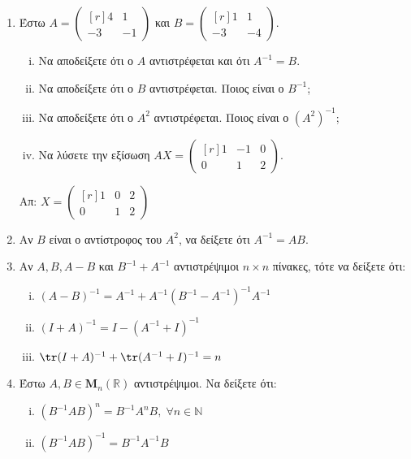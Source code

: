 \begin{enumerate}
  
  \item Έστω $ A = 
    \begin{pmatrix*}[r]
      4 & 1 \\
      -3 & -1
    \end{pmatrix*} $ και $ B = 
    \begin{pmatrix*}[r]
      1 & 1 \\
      -3 & -4
    \end{pmatrix*}$. 
    \begin{enumerate}[i)]
      \item Να αποδείξετε ότι ο $A$ αντιστρέφεται και ότι $ A^{-1} = B $.
      \item Να αποδείξετε ότι ο $ B $ αντιστρέφεται. Ποιος είναι ο $ B^{-1} $;
      \item Να αποδείξετε ότι ο $ A^{2} $ αντιστρέφεται. Ποιος είναι ο $ (A^{2})^{-1} $;
      \item Να λύσετε την εξίσωση $ AX= 
        \begin{pmatrix*}[r]
          1 & -1 & 0 \\
          0 & 1 & 2
        \end{pmatrix*} $.
    \end{enumerate}

    \hfill Απ: $ X= 
    \begin{pmatrix*}[r]
      1 & 0 & 2 \\
      0 & 1 & 2
    \end{pmatrix*} $ 

  \item Αν $B$ είναι ο αντίστροφος του $ A^{2} $, να δείξετε ότι $ A^{-1}=AB $.

  \item Αν $ A,B,A-B $ και $ B^{-1}+A^{-1} $ αντιστρέψιμοι 
    $ n \times n $ πίνακες, τότε να δείξετε ότι:
    \begin{enumerate}[i)]
      \item $ (A-B)^{-1} = A^{-1}+A^{-1}(B^{-1}-A^{-1})^{-1}A^{-1} $
      \item $ (I+A)^{-1} = I-(A^{-1}+I)^{-1} $
      \item $\tr(I+A)^{-1} + \tr(A^{-1}+I)^{-1} = n $
    \end{enumerate}
    
  \item Έστω $ A, B \in \textbf{M}_{n}(\mathbb{R}) $ αντιστρέψιμοι. Να δείξετε ότι:
    \begin{enumerate}[i)]
      \item $ (B^{-1}AB)^{n} = B^{-1}A^{n}B, \; \forall n \in \mathbb{N} $
      \item $ (B^{-1}AB)^{-1} = B^{-1}A^{-1}B $
    \end{enumerate}


\end{enumerate}
